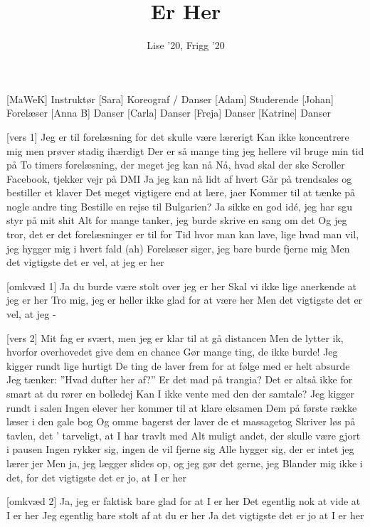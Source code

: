 \documentclass[a4paper,11pt]{article}
\title{Er Her}
\author{Lise '20, Frigg '20}
\begin{document}
\maketitle

\begin{roles}
[MaWeK] Instruktør
[Sara] Koreograf / Danser
[Adam] Studerende
[Johan] Forelæser
[Anna B] Danser
[Carla] Danser
[Freja] Danser
[Katrine] Danser
\end{roles}

\begin{props}
\end{props}


\begin{song}

[vers 1]
Jeg er til forelæsning for det skulle være lærerigt
Kan ikke koncentrere mig men prøver stadig ihærdigt
Der er så mange ting jeg hellere vil bruge min tid på
To timers forelæsning, der meget jeg kan nå
Nå, hvad skal der ske
Scroller Facebook, tjekker vejr på DMI
Ja jeg kan nå lidt af hvert
Går på trendsales og bestiller et klaver
Det meget vigtigere end at lære, jaer
Kommer til at tænke på nogle andre ting
Bestille en rejse til Bulgarien?
Ja sikke en god idé, jeg har sgu styr på mit shit
Alt for mange tanker, jeg burde skrive en sang om det
Og jeg tror, det er det forelæsninger er til for
Tid hvor man kan lave, lige hvad man vil, jeg hygger mig i hvert fald (ah)
Forelæser siger, jeg bare burde fjerne mig
Men det vigtigste det er vel, at jeg er her

[omkvæd 1]
Ja du burde være stolt over jeg er her
Skal vi ikke lige anerkende at jeg er her
Tro mig, jeg er heller ikke glad for at være her
Men det vigtigste det er vel, at jeg -

[vers 2]
Mit fag er svært, men jeg er klar til at gå distancen
Men de lytter ik, hvorfor overhovedet give dem en chance
Gør mange ting, de ikke burde! Jeg kigger rundt lige hurtigt
De ting de laver frem for at følge med er helt absurde
Jeg tænker: ”Hvad dufter her af?” Er det mad på trangia?
Det er altså ikke for smart at du rører en bolledej
Kan I ikke vente med den der samtale? Jeg kigger rundt i salen
Ingen elever her kommer til at klare eksamen
Dem på første række læser i den gale bog
Og omme bagerst der laver de et massagetog
Skriver løs på tavlen, det ' tarveligt, at I har travlt med
Alt muligt andet, der skulle være gjort i pausen
Ingen rykker sig, ingen de vil fjerne sig
Alle hygger sig, der er intet jeg lærer jer
Men ja, jeg lægger slides op, og jeg gør det gerne, jeg
Blander mig ikke i det, for det vigtigste det er jo, at I er her

[omkvæd 2]
Ja, jeg er faktisk bare glad for at I er her
Det egentlig nok at vide at I er her
Jeg egentlig bare stolt af at du er her
Ja det vigtigste det er jo at I er her

\end{song}
\end{document}
